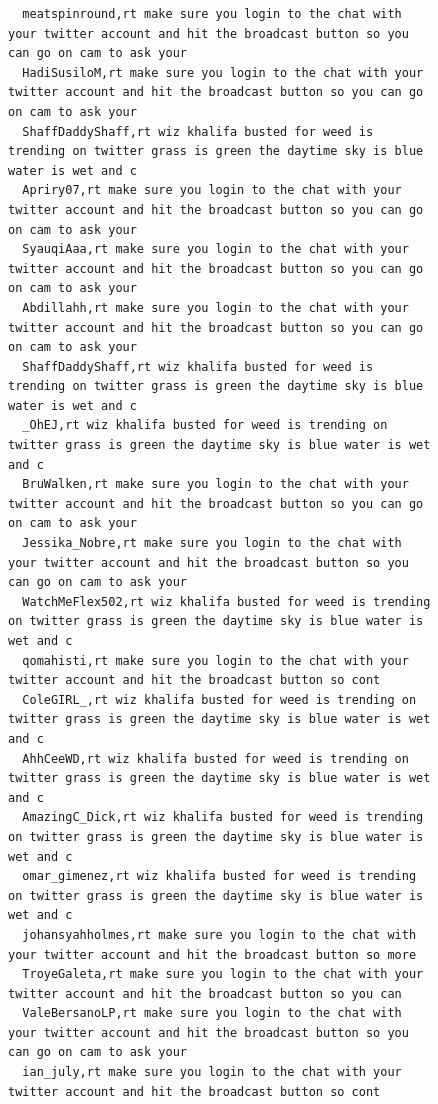 \begin{figure}[htpb]
\begin{verbatim}
  meatspinround,rt make sure you login to the chat with your twitter account and hit the broadcast button so you can go on cam to ask your
  HadiSusiloM,rt make sure you login to the chat with your twitter account and hit the broadcast button so you can go on cam to ask your
  ShaffDaddyShaff,rt wiz khalifa busted for weed is trending on twitter grass is green the daytime sky is blue water is wet and c
  Apriry07,rt make sure you login to the chat with your twitter account and hit the broadcast button so you can go on cam to ask your
  SyauqiAaa,rt make sure you login to the chat with your twitter account and hit the broadcast button so you can go on cam to ask your
  Abdillahh,rt make sure you login to the chat with your twitter account and hit the broadcast button so you can go on cam to ask your
  ShaffDaddyShaff,rt wiz khalifa busted for weed is trending on twitter grass is green the daytime sky is blue water is wet and c
  _OhEJ,rt wiz khalifa busted for weed is trending on twitter grass is green the daytime sky is blue water is wet and c
  BruWalken,rt make sure you login to the chat with your twitter account and hit the broadcast button so you can go on cam to ask your
  Jessika_Nobre,rt make sure you login to the chat with your twitter account and hit the broadcast button so you can go on cam to ask your
  WatchMeFlex502,rt wiz khalifa busted for weed is trending on twitter grass is green the daytime sky is blue water is wet and c
  qomahisti,rt make sure you login to the chat with your twitter account and hit the broadcast button so cont
  ColeGIRL_,rt wiz khalifa busted for weed is trending on twitter grass is green the daytime sky is blue water is wet and c
  AhhCeeWD,rt wiz khalifa busted for weed is trending on twitter grass is green the daytime sky is blue water is wet and c
  AmazingC_Dick,rt wiz khalifa busted for weed is trending on twitter grass is green the daytime sky is blue water is wet and c
  omar_gimenez,rt wiz khalifa busted for weed is trending on twitter grass is green the daytime sky is blue water is wet and c
  johansyahholmes,rt make sure you login to the chat with your twitter account and hit the broadcast button so more
  TroyeGaleta,rt make sure you login to the chat with your twitter account and hit the broadcast button so you can
  ValeBersanoLP,rt make sure you login to the chat with your twitter account and hit the broadcast button so you can go on cam to ask your
  ian_july,rt make sure you login to the chat with your twitter account and hit the broadcast button so cont


\end{verbatim}
\end{figure}
